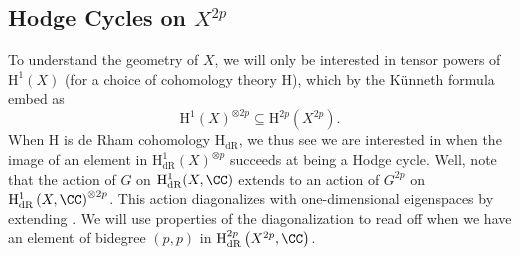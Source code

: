 \documentclass[../thesis.tex]{subfiles}
\begin{document}
\subsection{Hodge Cycles on \texorpdfstring{$X^{2p}$}{ X2p}} \label{subsec:classes-on-fermat-curve-power}
To understand the geometry of $X$, we will only be interested in tensor powers of $\mathrm H^1(X)$ (for a choice of cohomology theory $\mathrm H$), which by the K\"unneth formula embed as
\[\mathrm H^1(X)^{\otimes 2p}\subseteq\mathrm H^{2p}\left(X^{2p}\right).\]
When $\mathrm H$ is de Rham cohomology $\mathrm H_{\mathrm{dR}}$, we thus see we are interested in when the image of an element in $\mathrm H^1_{\mathrm{dR}}(X)^{\otimes p}$ succeeds at being a Hodge cycle. Well, note that the action of $G$ on $\mathrm H^1_{\mathrm{dR}}(X,\CC)$ extends to an action of $G^{2p}$ on $\mathrm H^1_{\mathrm{dR}}\left(X,\CC\right)^{\otimes2p}$. This action diagonalizes with one-dimensional eigenspaces by extending . We will use properties of the diagonalization to read off when we have an element of bidegree $(p,p)$ in $\mathrm H^{2p}_{\mathrm{dR}}\left(X^{2p},\CC\right)$.
\end{document}
